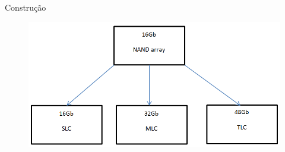 \documentclass[aspectratio=169,
				xcolor=table]{beamer}
\begin{document}
	\begin{frame}{Construção}
		\begin{figure}[hbtp]
			\centering
			\includegraphics[height=0.75\textheight, keepaspectratio]{../figs/cap08/ssd02.png}
		\end{figure}
	\end{frame}
	
\end{document}
